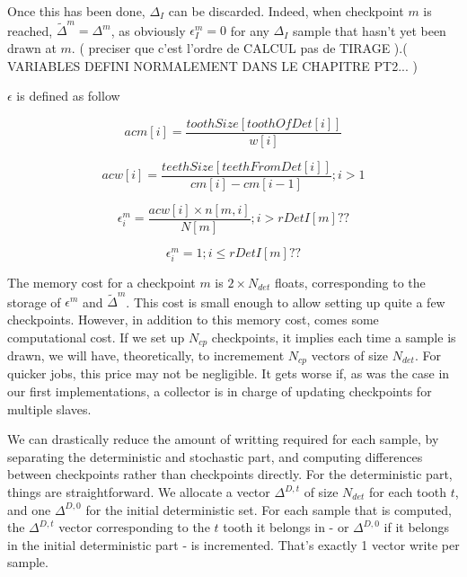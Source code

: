 \documentclass[./thesis.tex]{subfiles}
\begin{document}
Once this has been done, $\Delta_I$ can be discarded. Indeed, when checkpoint $m$ is reached, $\tilde \Delta^m = \Delta^m$, as obviously $\epsilon_I^m = 0$ for any $\Delta_I$ sample that hasn't yet been drawn at $m$. ( preciser que c'est l'ordre de CALCUL pas de TIRAGE ).( VARIABLES DEFINI NORMALEMENT DANS LE CHAPITRE PT2... )

$\epsilon$ is defined as follow


\begin{equation}
acm[i] = \frac{toothSize[toothOfDet[i]]}{w[i]}
\end{equation}

%
\begin{equation}
acw[i] = \frac{teethSize[teethFromDet[i]]}{cm[i]-cm[i-1]};i>1
\end{equation}




\begin{equation}
\epsilon^m_i = \frac{acw[i] \times n[m,i]}{N[m]}  ; i>rDetI[m] ??
\end{equation}



\begin{equation}
\epsilon^m_i = 1 ; i \leq rDetI[m] ??
\end{equation}


The memory cost for a checkpoint $m$ is $2 \times N_{det}$ floats, corresponding to the storage of $\epsilon^m$ and $\tilde \Delta^m$. This cost is small enough to allow setting up quite a few checkpoints. However, in addition to this memory cost, comes some computational cost. If we set up $N_{cp}$ checkpoints, it implies each time a sample is drawn, we will have, theoretically, to incremement $N_{cp}$ vectors of size $N_{det}$. For quicker jobs, this price may not be negligible. It gets worse if, as was the case in our first implementations, a collector is in charge of updating checkpoints for multiple slaves. 


We can drastically reduce the amount of writting required for each sample, by separating the deterministic and stochastic part, and computing differences between checkpoints rather than checkpoints directly.
For the deterministic part, things are straightforward. We allocate a vector $\Delta^{D,t}$ of size $N_{det}$ for each tooth $t$, and one $\Delta^{D,0}$ for the initial deterministic set. For each sample that is computed, the $\Delta^{D,t}$ vector corresponding to the $t$ tooth it belongs in - or $\Delta^{D,0}$ if it belongs in the initial deterministic part - is incremented. That's exactly 1 vector write per sample.
\end{document}
